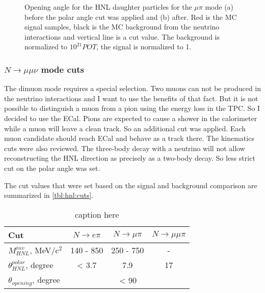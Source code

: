 \documentclass[../main.tex]{subfiles}
\begin{document}
\begin{figure}[!ht]
  \begin{minipage}[h]{0.49\linewidth}
  \end{minipage}
  \hfill
  \begin{minipage}[h]{0.49\linewidth}
  \end{minipage}
  \caption{Opening angle for the HNL daughter particles for the $\mu\pi$ mode (a) before the polar angle cut was applied and (b) after. Red is the MC signal samples, black is the MC background from the neutrino interactions and vertical line is a cut value. The background is normalized to $10^{21}POT$, the signal is normalized to 1.}
  \label{fig:HNL:kin2}
\end{figure}

\subsubsection{\texorpdfstring{$N\to\mu\mu\nu$}{Lg}  mode cuts}
The dimuon mode requires a special selection. Two muons can not be produced in the neutrino interactions and I want to use the benefits of that fact. But it is not possible to distinguish a muon from a pion using the energy loss in the TPC. So I decided to use the ECal. Pions are expected to cause a shower in the calorimeter while a muon will leave a clean track. So an additional cut was applied. Each muon candidate should reach ECal and behave as a track there. The kinematics cuts were also reviewed. The three-body decay with a neutrino will not allow reconstructing the HNL direction as precisely as a two-body decay. So less strict cut on the polar angle was set.

The cut values that were set based on the signal and background comparison are summarized in \autoref{tbl:hnl:cuts}.

\begin{table}[tb]
    \centering
    \begin{tabular}{|l|c|c|c|}
    \hline

    \hline
    Cut                         & $N\to e\pi$   & $N\to \mu\pi$ & $N\to\mu\mu\pi$ \\
    \hline
    $M_{HNL}^{inv}$, MeV/c${}^2$             & 140 - 850     & 250 - 750     &      -   \\
    \hline
    $\theta_{HNL}^{polar}$, degree      & <  3.7 & 7.9 & 17 \\
    \hline
    $\theta_{opening}$, degree  & \multicolumn{3}{c}{< 90} \\
    \hline
    \end{tabular}
    \caption{caption here}
    \label{tbl:hnl:cuts}
\end{table}
\end{document}
